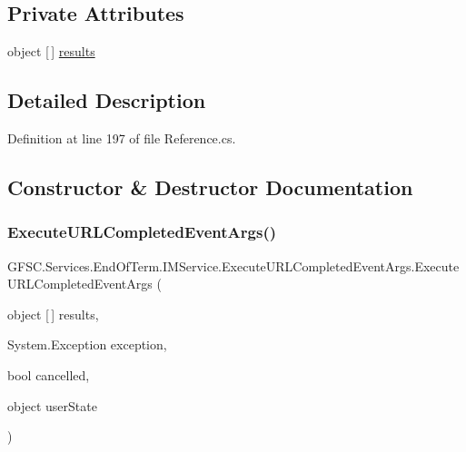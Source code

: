 \subsection*{Private Attributes}
\begin{DoxyCompactItemize}
\item 
object \mbox{[}$\,$\mbox{]} \mbox{\hyperlink{class_g_f_s_c_1_1_services_1_1_end_of_term_1_1_i_m_service_1_1_execute_u_r_l_completed_event_args_af0b5e795afaf8a5ba7f2ba12a1e7e808}{results}}
\end{DoxyCompactItemize}


\subsection{Detailed Description}


Definition at line 197 of file Reference.\+cs.



\subsection{Constructor \& Destructor Documentation}
\mbox{\label{class_g_f_s_c_1_1_services_1_1_end_of_term_1_1_i_m_service_1_1_execute_u_r_l_completed_event_args_a064d4cd3671c60f5e503ae99317af689}} 
\subsubsection{\texorpdfstring{Execute\+U\+R\+L\+Completed\+Event\+Args()}{ExecuteURLCompletedEventArgs()}}
{\footnotesize\ttfamily G\+F\+S\+C.\+Services.\+End\+Of\+Term.\+I\+M\+Service.\+Execute\+U\+R\+L\+Completed\+Event\+Args.\+Execute\+U\+R\+L\+Completed\+Event\+Args (\begin{DoxyParamCaption}\item[{object \mbox{[}$\,$\mbox{]}}]{results,  }\item[{System.\+Exception}]{exception,  }\item[{bool}]{cancelled,  }\item[{object}]{user\+State }\end{DoxyParamCaption})\hspace{0.3cm}{\ttfamily [package]}}



